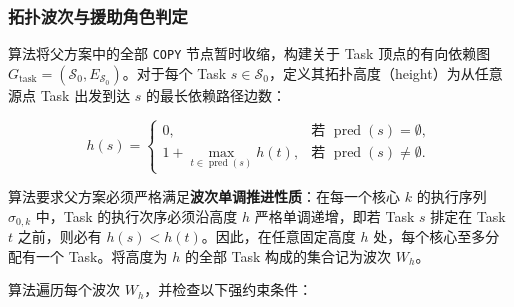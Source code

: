 \documentclass[anonymous,withtoc]{gmcm2026}
\begin{document}
\subsubsection{拓扑波次与援助角色判定}

算法将父方案中的全部 \texttt{COPY} 节点暂时收缩，构建关于 Task 顶点的有向依赖图 \(G_{\mathrm{task}} = (\mathcal{S}_0, E_{\mathcal{S}_0})\)。对于每个 Task \(s \in \mathcal{S}_0\)，定义其拓扑高度（height）为从任意源点 Task 出发到达 \(s\) 的最长依赖路径边数：

\begin{equation}
h(s) = \begin{cases} 0, & \text{若 } \operatorname{pred}(s) = \emptyset, \\ 1 + \max_{t \in \operatorname{pred}(s)} h(t), & \text{若 } \operatorname{pred}(s) \ne \emptyset. \end{cases}
\end{equation}

算法要求父方案必须严格满足\textbf{波次单调推进性质}：在每一个核心 \(k\) 的执行序列 \(\sigma_{0,k}\) 中，Task 的执行次序必须沿高度 \(h\) 严格单调递增，即若 Task \(s\) 排定在 Task \(t\) 之前，则必有 \(h(s) < h(t)\)。因此，在任意固定高度 \(h\) 处，每个核心至多分配有一个 Task。将高度为 \(h\) 的全部 Task 构成的集合记为波次 \(W_h\)。

算法遍历每个波次 \(W_h\)，并检查以下强约束条件：
\end{document}
